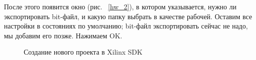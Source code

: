 \documentclass[a4paper,oneside ,14pt]{extreport}
\begin{document}
После этого появится окно (рис. ~\ref{hw_2}), в котором указывается, нужно ли 
экспортировать bit-файл, и какую папку выбрать в качестве рабочей. Оставим все 
настройки в состояниях по умолчанию; bit-файл экспортировать сейчас не надо, мы 
добавим его позже. Нажимаем OK.


\begin{figure}[htbp]	
	\caption{Создание нового проекта в Xilinx SDK} %
\end{figure}
\end{document}
